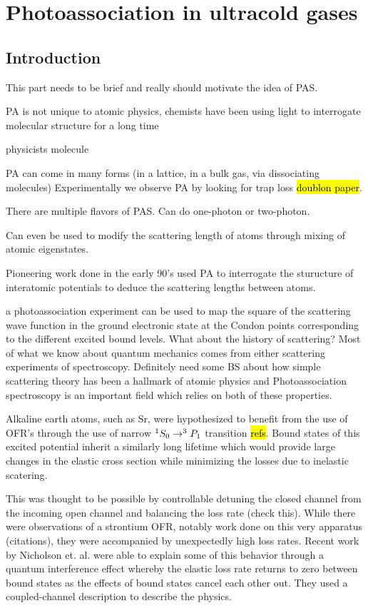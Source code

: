 \chapter{Photoassociation in ultracold gases}
\label{ch:chap3}

\section{Introduction}
\label{sec:pas_intro}

This part needs to be brief and really should motivate the idea of PAS.

PA is not unique to atomic physics, chemists have been using light to interrogate molecular structure for a long time

physicists molecule

PA can come in many forms (in a lattice, in a bulk gas, via dissociating molecules) Experimentally we observe PA by looking for trap loss \hl{doublon paper}.

There are multiple flavors of PAS. Can do one-photon or two-photon.

Can even be used to modify the scattering length of atoms through mixing of atomic eigenstates. 

Pioneering work done in the early 90's used PA to interrogate the sturucture of interatomic potentials to deduce the scattering lengths between atoms.

a photoassociation experiment can be used to map the square of the scattering wave function in the ground electronic state at the Condon points corresponding to the different excited bound levels. \cite{Borkowski2009}
What about the history of scattering? 
Most of what we know about quantum mechanics comes from either scattering experiments of spectroscopy. 
Definitely need some BS about how simple scattering theory has been a hallmark of atomic physics and 
Photoassociation spectroscopy is an important field which relies on both of these properties.

Alkaline earth atoms, such as Sr, were hypothesized to benefit from the use of OFR's through the use of narrow $^1S_0\rightarrow^3P_1$ transition \hl{refs}. Bound states of this excited potential inherit a similarly long lifetime which would provide large changes in the elastic cross section while minimizing the losses due to inelastic scatering. 

This was thought to be possible by controllable detuning the closed channel from the incoming open channel and balancing the loss rate (check this). While there were observations of a strontium OFR, notably work done on this very apparatus (citations), they were accompanied by unexpectedly high loss rates. Recent work by Nicholson et. al. were able to explain some of this behavior through a quantum interference effect whereby the elastic loss rate returns to zero between bound states as the effects of bound states cancel each other out. They used a coupled-channel description to describe the physics.
 
